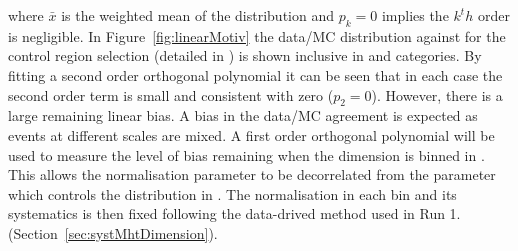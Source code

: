 where $\bar{x}$ is the weighted mean of the distribution and $p_k = 0$ 
implies the $k^th$ order is negligible.
In Figure~\ref{fig:linearMotiv} the data/MC 
distribution against \mht for the control region selection 
(detailed in \cite{CMS_AN_2013-366}) is shown inclusive 
in \scalht and categories. By fitting a second order orthogonal polynomial
it can be seen that in each case the second order 
term is small and consistent with zero ($p_2 = 0$). 
However, there is a large remaining linear bias. 
A bias in the data/MC agreement is expected as events 
at different scales are mixed.
A first order orthogonal polynomial
will be used to measure the level of bias remaining 
when the \mht dimension is binned in \scalht.
This allows the normalisation parameter to be
decorrelated from the parameter which controls
the distribution in \mht.
The normalisation in each \scalht bin and its systematics 
is then fixed following the data-drived method used in Run 1. 
(Section~\ref{sec:systMhtDimension}).
